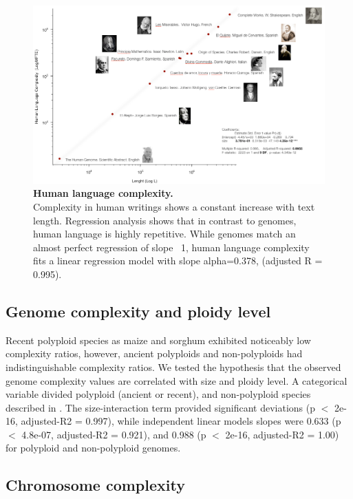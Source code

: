 \begin{figure}[htpb] 
\centering
\includegraphics[width=\textwidth]{tex_source/figures/dna_struct/language_complexity.png}
\caption[Human language complexity]{{\bf Human language complexity.} \\
Complexity in human writings shows a constant increase with text length. Regression analysis shows that in contrast to genomes, human language is highly repetitive. While genomes match an almost perfect regression of slope ~1, human language complexity fits a linear regression model with slope alpha=0.378, (adjusted R = 0.995).}
\label{fig:lang_compl}
\end{figure}

\subsection{Genome complexity and ploidy level}
\label{sec:genome-compl-ploidy}

Recent polyploid species as maize and sorghum exhibited noticeably low complexity ratios, however, ancient polyploids and non-polyploids had indistinguishable complexity ratios. We tested the hypothesis that the observed genome complexity values are correlated with size and ploidy level. A categorical variable divided polyploid (ancient or recent), and non-polyploid species described in . The size-interaction term provided significant deviations (p $<$ 2e-16, adjusted-R2 = 0.997), while independent linear models slopes were 0.633 (p $<$ 4.8e-07, adjusted-R2 = 0.921), and 0.988 (p $<$ 2e-16, adjusted-R2 = 1.00) for polyploid and non-polyploid genomes. 

\subsection{Chromosome complexity}
\label{sec:chrom-compl}

